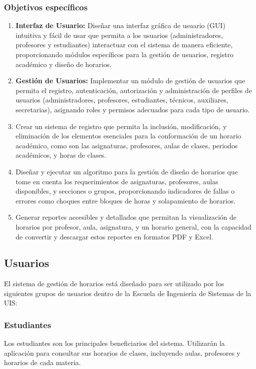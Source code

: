 \documentclass[12pt]{article} %
\begin{document}
\subsubsection{Objetivos específicos}
\begin{enumerate}[font=\bfseries] %
\item \textbf{Interfaz de Usuario:} Diseñar una interfaz gráfica de usuario (GUI) intuitiva y fácil de usar que permita a los usuarios (administradores, profesores y estudiantes) interactuar con el sistema de manera eficiente, proporcionando módulos específicos para la gestión de usuarios, registro académico y diseño de horarios.
\item \textbf{Gestión de Usuarios:} Implementar un módulo de gestión de usuarios que permita el registro, autenticación, autorización y administración de perfiles de usuarios (administradores, profesores, estudiantes, técnicos, auxiliares, secretarias), asignando roles y permisos adecuados para cada tipo de usuario.
\item Crear un sistema de registro que permita la inclusión, modificación, y eliminación de los elementos esenciales para la conformación de un horario académico, como son las asignaturas, profesores, aulas de clases, periodos académicos, y horas de clases.
\item Diseñar y ejecutar un algoritmo para la gestión de diseño de horarios que tome en cuenta los requerimientos de asignaturas, profesores, aulas disponibles, y secciones o grupos, proporcionando indicadores de fallas o errores como choques entre bloques de horas y solapamiento de horarios.
\item Generar reportes accesibles y detallados que permitan la visualización de horarios por profesor, aula, asignatura, y un horario general, con la capacidad de convertir y descargar estos reportes en formatos PDF y Excel.
\end{enumerate}
\subsection{Usuarios}
\noindent
El sistema de gestión de horarios está diseñado para ser utilizado por los siguientes grupos de usuarios dentro de la Escuela de Ingeniería de Sistemas de la UIS:
\subsubsection{Estudiantes}
\noindent
Los estudiantes son los principales beneficiarios del sistema. Utilizarán la aplicación para consultar sus horarios de clases, incluyendo aulas, profesores y horarios de cada materia. 
\end{document}
